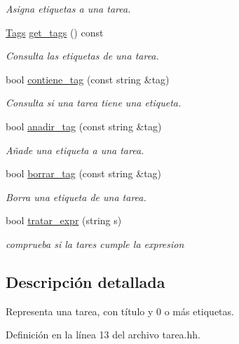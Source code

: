 \begin{DoxyCompactItemize}
\begin{DoxyCompactList}\small\item\em Asigna etiquetas a una tarea. \end{DoxyCompactList}\item 
\hyperlink{class_tags}{Tags} \hyperlink{class_tarea_a36fa738d7b7b34992e723c69a7c67065}{get\-\_\-tags} () const 
\begin{DoxyCompactList}\small\item\em Consulta las etiquetas de una tarea. \end{DoxyCompactList}\item 
bool \hyperlink{class_tarea_ac5dd725d9b2868fe84af969e83f1ecbd}{contiene\-\_\-tag} (const string \&tag)
\begin{DoxyCompactList}\small\item\em Consulta si una tarea tiene una etiqueta. \end{DoxyCompactList}\item 
bool \hyperlink{class_tarea_ad2a354a636f53e862841f2407acedc72}{anadir\-\_\-tag} (const string \&tag)
\begin{DoxyCompactList}\small\item\em Añade una etiqueta a una tarea. \end{DoxyCompactList}\item 
bool \hyperlink{class_tarea_a09c81269d5b51fd3418ab38fbc283625}{borrar\-\_\-tag} (const string \&tag)
\begin{DoxyCompactList}\small\item\em Borra una etiqueta de una tarea. \end{DoxyCompactList}\item 
bool \hyperlink{class_tarea_a8b6bebd509d90a33310a1e9a7215c494}{tratar\-\_\-expr} (string s)
\begin{DoxyCompactList}\small\item\em comprueba si la tares cumple la expresion \end{DoxyCompactList}\end{DoxyCompactItemize}


\subsection{Descripción detallada}
Representa una tarea, con título y 0 o más etiquetas. 

Definición en la línea 13 del archivo tarea.\-hh.



